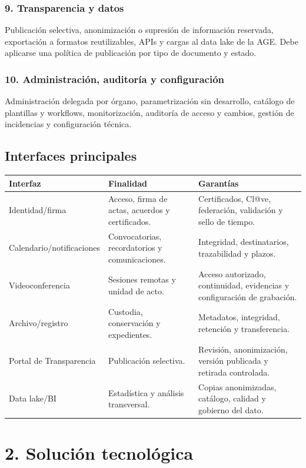 \documentclass[11pt,a4paper]{article}
\begin{document}
\subsubsection{9. Transparencia y datos}
Publicación selectiva, anonimización o supresión de información reservada, exportación a formatos reutilizables, APIs y cargas al data lake de la AGE. Debe aplicarse una política de publicación por tipo de documento y estado.

\subsubsection{10. Administración, auditoría y configuración}
Administración delegada por órgano, parametrización sin desarrollo, catálogo de plantillas y workflows, monitorización, auditoría de acceso y cambios, gestión de incidencias y configuración técnica.

\subsection{Interfaces principales}
\begin{center}
\begin{tabularx}{0.95\textwidth}{l Y Y}\toprule
\textbf{Interfaz} & \textbf{Finalidad} & \textbf{Garantías}\\\midrule
Identidad/firma & Acceso, firma de actas, acuerdos y certificados. & Certificados, Cl@ve, federación, validación y sello de tiempo.\\
Calendario/notificaciones & Convocatorias, recordatorios y comunicaciones. & Integridad, destinatarios, trazabilidad y plazos.\\
Videoconferencia & Sesiones remotas y unidad de acto. & Acceso autorizado, continuidad, evidencias y configuración de grabación.\\
Archivo/registro & Custodia, conservación y expedientes. & Metadatos, integridad, retención y transferencia.\\
Portal de Transparencia & Publicación selectiva. & Revisión, anonimización, versión publicada y retirada controlada.\\
Data lake/BI & Estadística y análisis transversal. & Copias anonimizadas, catálogo, calidad y gobierno del dato.\\
\bottomrule\end{tabularx}\end{center}

\section{2. Solución tecnológica}
\end{document}
